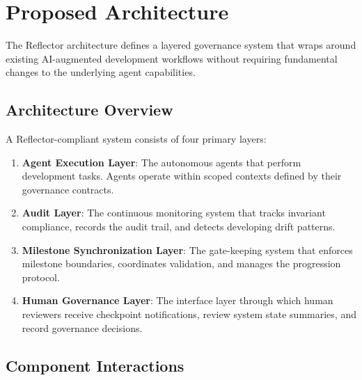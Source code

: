 \section{Proposed Architecture}
\label{sec:proposed-architecture}

%

The Reflector architecture defines a layered governance system that wraps around
existing AI-augmented development workflows without requiring fundamental changes
to the underlying agent capabilities.

\subsection{Architecture Overview}

A Reflector-compliant system consists of four primary layers:

\begin{enumerate}
  \item \textbf{Agent Execution Layer}: The autonomous agents that perform development
    tasks. Agents operate within scoped contexts defined by their governance contracts.

  \item \textbf{Audit Layer}: The continuous monitoring system that tracks invariant
    compliance, records the audit trail, and detects developing drift patterns.

  \item \textbf{Milestone Synchronization Layer}: The gate-keeping system that enforces
    milestone boundaries, coordinates validation, and manages the progression protocol.

  \item \textbf{Human Governance Layer}: The interface layer through which human
    reviewers receive checkpoint notifications, review system state summaries, and
    record governance decisions.
\end{enumerate}

\subsection{Component Interactions}

